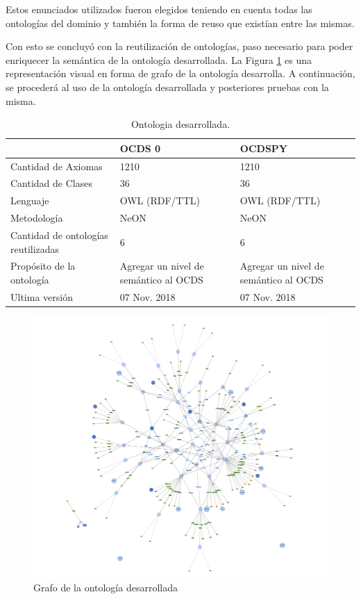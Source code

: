 Estos enunciados utilizados fueron elegidos teniendo en cuenta todas las ontologías del dominio y también la forma de reuso que existían entre las mismas. 

Con esto se concluyó con la reutilización de ontologías, paso necesario para poder enriquecer la semántica de la ontología desarrollada. La Figura \ref{img:grafo ontologia desarrolla} es una representación visual en forma de grafo de la ontología desarrolla. A continuación, se procederá al uso de la ontología desarrollada y posteriores pruebas con la misma.


\begin{table}[!htb]
    \caption{Ontologia desarrollada.}
    \label{tab:comparacion_ontologias}
    
    \scriptsize 
    \begin{tabular}{|L{6cm}|C{2.5cm}}
    \hline
     &  OCDS 0  & OCDSPY \\
    \hline
    Cantidad de Axiomas & 1210 & 1210 \\
    \hline
    Cantidad de Clases & 36 & 36 \\
    \hline
    Lenguaje & OWL (RDF/TTL) & OWL (RDF/TTL) \\
    \hline
    Metodología & NeON & NeON \\
     \hline
    Cantidad de ontologías reutilizadas & 6 & 6\\
    \hline
    Propósito de la ontología & Agregar un nivel de semántico al OCDS  & Agregar un nivel de semántico al OCDS \\
    \hline
    Ultima versión & 07 Nov. 2018 & 07 Nov. 2018 \\
    \hline
    \end{tabular}
    \bigskip
\end{table}

\begin{figure}[ht!]
    \includegraphics[width=180mm]{figuras/grafoOCDS.png}
    \caption{Grafo de la ontología desarrollada}
    \label{img:grafo ontologia desarrolla}
    \end{figure}